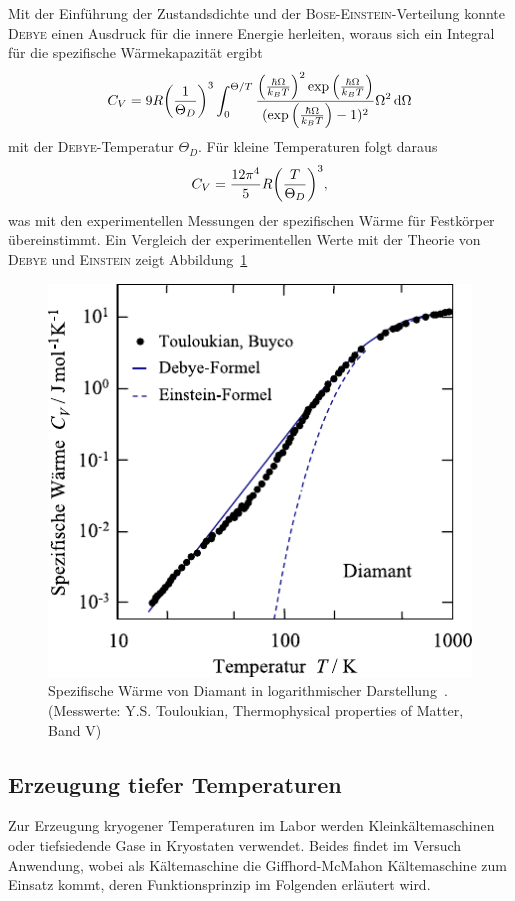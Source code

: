\documentclass[parskip=half, a4paper,twoside,final]{article}
\begin{document}
Mit der Einführung der Zustandsdichte und der \textsc{Bose-Einstein}-Verteilung konnte \textsc{Debye} einen Ausdruck für die innere Energie herleiten, woraus sich ein Integral für die spezifische Wärmekapazität ergibt
\begin{align}\label{eqn:Debye_Modell}
  C_V = 9R \qty(\frac{1}{\Theta_D})^3 \int_0^{\Theta/T} \frac{\qty(\frac{\hbar\Omega}{k_B T})^2 \exp\qty(\frac{\hbar\Omega}{k_B T})}{(\exp\qty(\frac{\hbar\Omega}{k_B T})-1)^2} \Omega^2 \dd{\Omega}
\end{align}
mit der \textsc{Debye}-Temperatur $\Theta_D$. Für kleine Temperaturen folgt daraus
\begin{align}
  C_V = \frac{12\pi^4}{5}R \qty(\frac{T}{\Theta_D})^3,
\end{align}
was mit den experimentellen Messungen der spezifischen Wärme für Festkörper übereinstimmt. Ein Vergleich der experimentellen Werte mit der Theorie von \textsc{Debye} und \textsc{Einstein} zeigt Abbildung~\ref{fig:Debye_Einstein}

\begin{figure}[htp]
  \centering
  \includegraphics{Bilder/Debye_Einstein.pdf}
  \caption{Spezifische Wärme von Diamant in logarithmischer Darstellung~\cite{Hunklinger}. (Messwerte: Y.S. Touloukian, Thermophysical properties of Matter, Band V)}
  \label{fig:Debye_Einstein}
\end{figure}

\subsection{Erzeugung tiefer Temperaturen}
Zur Erzeugung kryogener Temperaturen im Labor werden Kleinkältemaschinen oder tiefsiedende Gase in Kryostaten verwendet. Beides findet im Versuch Anwendung, wobei als Kältemaschine die Giffhord-McMahon Kältemaschine zum Einsatz kommt, deren Funktionsprinzip im Folgenden erläutert wird.
\end{document}
